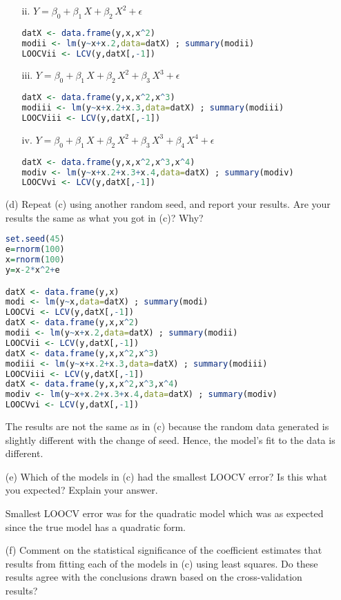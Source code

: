\documentclass[11pt]{report}
\begin{document}
\begin{itemize}
\begin{itemize}
\item[ii. ] $Y=\beta_0+\beta_1\,X+\beta_2\,X^2+\epsilon$

\begin{lstlisting}[language=R]
datX <- data.frame(y,x,x^2)
modii <- lm(y~x+x.2,data=datX) ; summary(modii)
LOOCVii <- LCV(y,datX[,-1]) 
\end{lstlisting}

\item[iii. ] $Y=\beta_0+\beta_1\,X+\beta_2\,X^2+\beta_3\,X^3+\epsilon$

\begin{lstlisting}[language=R]
datX <- data.frame(y,x,x^2,x^3)
modiii <- lm(y~x+x.2+x.3,data=datX) ; summary(modiii)
LOOCViii <- LCV(y,datX[,-1])
\end{lstlisting}

\item[iv. ] $Y=\beta_0+\beta_1\,X+\beta_2\,X^2+\beta_3\,X^3+\beta_4\,X^4+\epsilon$

\begin{lstlisting}[language=R]
datX <- data.frame(y,x,x^2,x^3,x^4) 
modiv <- lm(y~x+x.2+x.3+x.4,data=datX) ; summary(modiv)
LOOCVvi <- LCV(y,datX[,-1])
\end{lstlisting}
\end{itemize}

\item[(d) ] Repeat (c) using another random seed, and report your results. Are your results the same as what you got in (c)? Why?

\begin{lstlisting}[language=R]
set.seed(45)
e=rnorm(100)
x=rnorm(100)
y=x-2*x^2+e

datX <- data.frame(y,x)
modi <- lm(y~x,data=datX) ; summary(modi)
LOOCVi <- LCV(y,datX[,-1])
datX <- data.frame(y,x,x^2)
modii <- lm(y~x+x.2,data=datX) ; summary(modii)
LOOCVii <- LCV(y,datX[,-1]) 
datX <- data.frame(y,x,x^2,x^3)
modiii <- lm(y~x+x.2+x.3,data=datX) ; summary(modiii)
LOOCViii <- LCV(y,datX[,-1])
datX <- data.frame(y,x,x^2,x^3,x^4) 
modiv <- lm(y~x+x.2+x.3+x.4,data=datX) ; summary(modiv)
LOOCVvi <- LCV(y,datX[,-1])
\end{lstlisting}

The results are not the same as in (c) because the random data generated is slightly different with the change of seed. Hence, the model's fit to the data is different.

\item[(e) ] Which of the models in (c) had the smallest LOOCV error? Is this what you expected? Explain your answer.

Smallest LOOCV error was for the quadratic model which was as expected since the true model has a quadratic form.

\item[(f) ] Comment on the statistical significance of the coefficient estimates that results from fitting each of the models in (c) using least squares. Do these results agree with the conclusions drawn based on the cross-validation results? 
\end{itemize}
\end{document}
